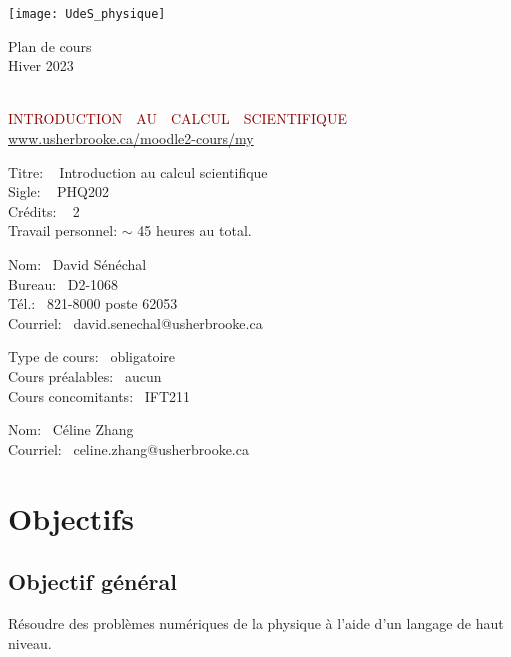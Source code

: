 \documentclass[10pt,usletter]{article}
\begin{document}
\parbox{5cm}{\texttt{[image: UdeS\_physique]}}
\hfill\parbox{3cm}{\raggedleft Plan de cours\\
Hiver 2023\\
~~
}

\begin{center}
{\Large\textcolor{DarkRed}{INTRODUCTION~~AU~~CALCUL~~SCIENTIFIQUE}}\\
\href{http://www.usherbrooke.ca/moodle2-cours/my}{www.usherbrooke.ca/moodle2-cours/my}
\bigskip


\begin{tcbraster}[raster columns=2, 
	raster valign=top, 
	raster left skip=0mm, 
	raster right skip=0mm,
	raster column skip=2mm
]
%
\begin{tcolorbox}[tcbplanstyle, title = Cours]
Titre: ~ Introduction au calcul scientifique\\
Sigle: ~ PHQ202\\
Crédits: ~ 2\\
Travail personnel: $\sim$ 45 heures au total.
\end{tcolorbox}
%
\begin{tcolorbox}[tcbplanstyle, title = Professeur]
Nom:~ David Sénéchal\\
Bureau:~ D2-1068\\
Tél.:~ 821-8000 poste 62053\\
Courriel:~ david.senechal@usherbrooke.ca
\end{tcolorbox}
%
\begin{tcolorbox}[tcbplanstyle, title = Place du cours dans le programme]
Type de cours:~ obligatoire\\
Cours préalables:~ aucun\\
Cours concomitants:~ IFT211
\end{tcolorbox}
%
\begin{tcolorbox}[tcbplanstyle, title = Moniteur/correcteur]
Nom:~ Céline Zhang\\
Courriel:~ celine.zhang@usherbrooke.ca
\end{tcolorbox}
%
\end{tcbraster}
\end{center}

\section{Objectifs}

\subsection*{Objectif général}
Résoudre des problèmes numériques de la physique à l'aide d'un langage de haut niveau.
\end{document}
